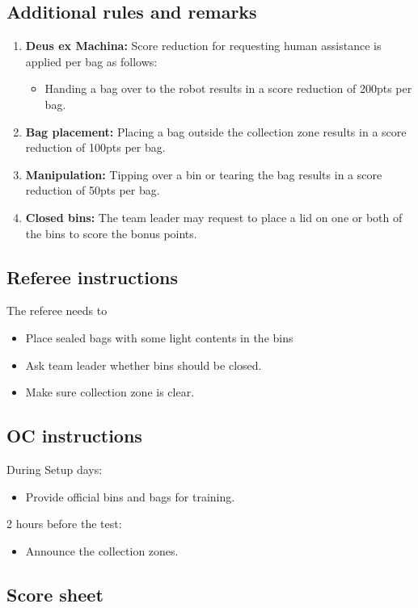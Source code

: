 \subsection*{Additional rules and remarks}
\begin{enumerate}[nosep]
	\item \textbf{Deus ex Machina:} Score reduction for requesting human assistance is applied per bag as follows:
	\begin{itemize}[nosep]
		\item Handing a bag over to the robot results in a score reduction of 200pts per bag.
	\end{itemize}

	\item \textbf{Bag placement:} Placing a bag outside the collection zone results in a score reduction of 100pts per bag.
	\item \textbf{Manipulation:}  Tipping over a bin or tearing the bag results in a score reduction of 50pts per bag.
	\item \textbf{Closed bins:} The team leader may request to place a lid on one or both of the bins to score the bonus points.

\end{enumerate}

\subsection*{Referee instructions}

The referee needs to
\begin{itemize}
	\item Place sealed bags with some light contents in the bins
	\item Ask team leader whether bins should be closed.
	\item Make sure collection zone is clear.
\end{itemize}

\subsection*{OC instructions}
During Setup days:
\begin{itemize}
	\item Provide official bins and bags for training.
\end{itemize}

2 hours before the test:
\begin{itemize}
	\item Announce the collection zones.
\end{itemize}

\subsection*{Score sheet}



